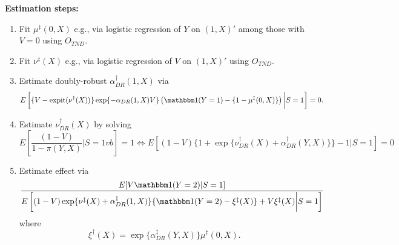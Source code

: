 \documentclass[12pt]{article}
\begin{document}
\textbf{Estimation steps:}
\begin{enumerate}
    \item Fit $\mu^\ddagger(0,X)$ e.g., via logistic regression of $Y$ on $(1,X)'$ among those with $V= 0$ using $O_{TND}$.
    \item Fit $\nu^\ddagger(X)$ e.g., via logistic regression of $V$ on $(1,X)'$ using $O_{TND}$.
    \item  Estimate doubly-robust $\alpha_{DR}^\dagger(1,X)$ via 
    \[E\left[\{V - \operatorname{expit}(\nu^\dagger(X))\}\exp\{-\alpha_{DR}(1,X)V\}\left(\mathbbm1(Y=1) - \{1-\mu^\ddagger(0, X)\}\right)\bigg| S= 1\right] = 0.\]
    \item Estimate $\nu_{DR}^\dagger(X)$ by solving 
    \[E\left[\dfrac{(1-V)}{1 -\pi(Y,X)} \bigg| S=1vb\right] = 1 \iff E[(1-V)\{1 + \exp\{\nu_{DR}^\dagger(X) + \alpha^\dagger_{DR}(Y,X)\}\} - 1 | S = 1] = 0\]
    \item Estimate effect via
    \[\dfrac{E[V \mathbbm 1(Y =2)|S=1]}{E\left[(1 - V) \exp\{\nu^\ddagger(X) + \alpha^\ddagger_{DR}(1,X)\}\{\mathbbm 1(Y = 2) - \xi^\ddagger(X)\} + V\xi^\ddagger(X) \bigg|S=1 \right]}\]
    where
    \[\xi^\dagger(X)= \exp\{\alpha^\ddagger_{DR}(Y,X)\}\mu^\ddagger(0,X).\]
\end{enumerate}

\newpage
\end{document}

